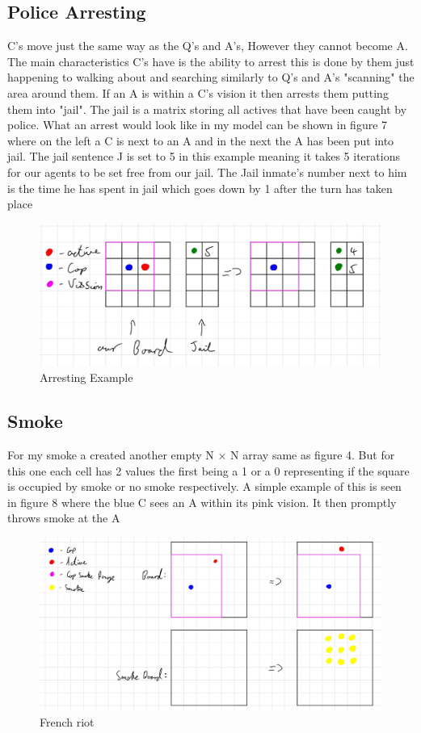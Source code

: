 \documentclass[11pt]{article}
\begin{document}
	\subsection{Police Arresting}
	C's move just the same way as the Q's and A's, However they cannot become A. The main characteristics C's have is the ability to arrest this is done by them just happening to walking about and searching similarly to Q's and A's "scanning" the area around them. If an A is within a C's vision it then arrests them putting them into "jail". The jail is a matrix storing all actives that have been caught by police. What an arrest would look like in my model can be shown in figure 7 where on the left a C is next to an A and in the next the A has been put into jail. The jail sentence J is set to 5 in this example meaning it takes 5 iterations for our agents to be set free from our jail. The Jail inmate's number next to him is the time he has spent in jail which goes down by 1 after the turn has taken place
	\begin{figure}[H]
		\includegraphics[width=\linewidth]{arresting visual.png}
		\caption{Arresting Example}
		\label{fig:frenchriot}
	\end{figure}	
	\subsection{Smoke}
	For my smoke a created another empty N $\times$ N array same as figure 4. But for this one each cell has 2 values the first being a 1 or a 0 representing if the square is occupied by smoke or no smoke respectively. A simple example of this is seen in figure 8 where the blue C sees an A within its pink vision. It then promptly throws smoke at the A
		
	\begin{figure}[H]
		\includegraphics[width=\linewidth]{smoke visual.png}
		\caption{French riot}
		\label{fig:frenchriot}
	\end{figure}	
\end{document}
